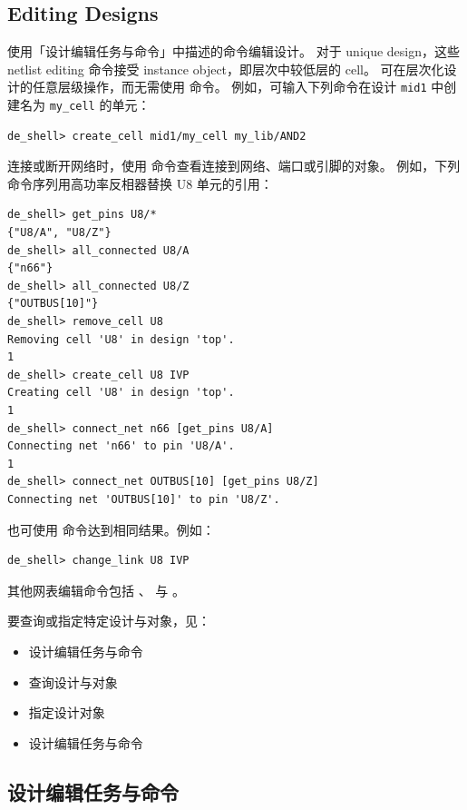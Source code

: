 \subsection*{Editing Designs}

使用「设计编辑任务与命令」中描述的命令编辑设计。
对于 unique design，这些 netlist editing 命令接受 instance object，即层次中较低层的 cell。
可在层次化设计的任意层级操作，而无需使用  命令。
例如，可输入下列命令在设计 \texttt{mid1} 中创建名为 \texttt{my\_cell} 的单元：
\begin{lstlisting}
de_shell> create_cell mid1/my_cell my_lib/AND2
\end{lstlisting}

连接或断开网络时，使用  命令查看连接到网络、端口或引脚的对象。
例如，下列命令序列用高功率反相器替换 U8 单元的引用：
\begin{lstlisting}
de_shell> get_pins U8/*
{"U8/A", "U8/Z"}
de_shell> all_connected U8/A
{"n66"}
de_shell> all_connected U8/Z
{"OUTBUS[10]"}
de_shell> remove_cell U8
Removing cell 'U8' in design 'top'.
1
de_shell> create_cell U8 IVP
Creating cell 'U8' in design 'top'.
1
de_shell> connect_net n66 [get_pins U8/A]
Connecting net 'n66' to pin 'U8/A'.
1
de_shell> connect_net OUTBUS[10] [get_pins U8/Z]
Connecting net 'OUTBUS[10]' to pin 'U8/Z'.
\end{lstlisting}

也可使用  命令达到相同结果。例如：
\begin{lstlisting}
de_shell> change_link U8 IVP
\end{lstlisting}

其他网表编辑命令包括 、 与 。

要查询或指定特定设计与对象，见：
\begin{itemize}
  \item 设计编辑任务与命令
  \item 查询设计与对象
  \item 指定设计对象
\end{itemize}

\begin{seeAlsoBox}
\begin{itemize}
  \item 设计编辑任务与命令
\end{itemize}
\end{seeAlsoBox}

\subsection{设计编辑任务与命令}
